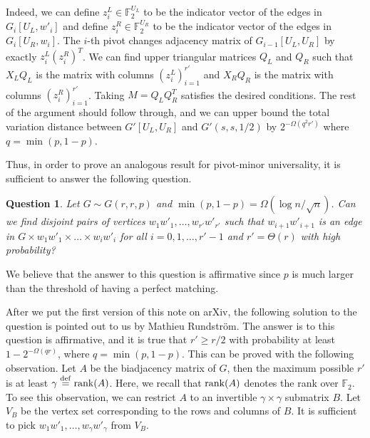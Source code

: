 \documentclass[reqno]{amsart}
\newtheorem{question}[theorem]{Question}
\theoremstyle{definition}
\numberwithin{theorem}{section}
\renewcommand{\geq}{\ge}
\newcommand{\FF}{\mathbb F}
\def\eqdef{\overset{\rm{def}}{=}}
\renewcommand{\ge}{\geqslant}
\newcommand{\F}{\mathbb{F}}
\newcommand{\rank}{\textup{rank}}
\begin{document}
Indeed, we can define $z_i^L\in \F_2^{U_L}$ to be the indicator vector of the edges in $G_i[U_L,w'_i]$ and define $z_i^R\in \F_2^{U_R}$ to be the indicator vector of the edges in $G_i[U_R,w_i]$. The $i$-th pivot changes adjacency matrix of $G_{i-1}[U_L,U_R]$ by exactly $z_i^L(z_i^R)^T$. We can find upper triangular matrices $Q_L$ and $Q_R$ such that $X_LQ_L$ is the matrix with columns $(z_i^L)_{i = 1}^{r'}$ and $X_RQ_R$ is the matrix with columns $(z_i^R)_{i = 1}^{r'}$. Taking $M = Q_LQ_R^T$ satisfies the desired conditions. The rest of the argument should follow through, and we can upper bound the total variation distance between $G'[U_L,U_R]$ and $G'(s,s,1/2)$ by $2^{-\Omega(q^2r')}$ where $q=\min(p,1-p)$.

Thus, in order to prove an analogous result for pivot-minor universality, it is sufficient to answer the following question.
\begin{question}
    Let $G\sim G(r,r,p)$ and $\min(p,1-p)=\Omega(\log n/\sqrt{n})$. Can we find disjoint pairs of vertices $w_1w'_1,\dots,w_{r'}w'_{r'}$ such that $w_{i+1}w'_{i+1}$ is an edge in $G\times w_1w'_1\times\dots\times w_{i}w'_{i}$ for all $i=0,1,\dots,r'-1$ and $r'=\Theta(r)$ with high probability?
\end{question}
We believe that the answer to this question is affirmative since $p$ is much larger than the threshold of having a perfect matching.


After we put the first version of this note on arXiv, the following solution to the question is pointed out to us by Mathieu Rundstr\"om. The answer is to this question is affirmative, and it is true that $r'\geq r/2$ with probability at least $1-2^{-\Omega(qr)}$, where $q=\min(p,1-p)$. This can be proved with the following observation. Let $A$ be the biadjacency matrix of $G$, then the maximum possible $r'$ is at least $\gamma\eqdef\rank(A)$. Here, we recall that $\rank(A)$ denotes the rank over $\FF_2$. To see this observation, we can restrict $A$ to an invertible $\gamma\times\gamma$ submatrix $B$. Let $V_B$ be the vertex set corresponding to the rows and columns of $B$. It is sufficient to pick $w_1w'_1,\dots,w_{\gamma}w'_{\gamma}$ from $V_B$.
\end{document}
